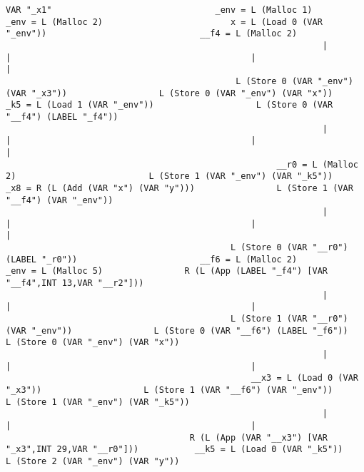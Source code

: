 \begin{landscape}
\begin{lstlisting}[basicstyle=\fontsize{6}{7}\selectfont\ttfamily]
            VAR "_x1"                                _env = L (Malloc 1)                                  _env = L (Malloc 2)                         x = L (Load 0 (VAR "_env"))                              __f4 = L (Malloc 2)
                                                              |                                                    |                                               |                                                    |
                                             L (Store 0 (VAR "_env") (VAR "_x3"))                  L (Store 0 (VAR "_env") (VAR "x"))                _k5 = L (Load 1 (VAR "_env"))                    L (Store 0 (VAR "__f4") (LABEL "_f4"))
                                                              |                                                    |                                               |                                                    |
                                                     __r0 = L (Malloc 2)                          L (Store 1 (VAR "_env") (VAR "_k5"))           _x8 = R (L (Add (VAR "x") (VAR "y")))                L (Store 1 (VAR "__f4") (VAR "_env"))
                                                              |                                                    |                                               |                                                    |
                                            L (Store 0 (VAR "__r0") (LABEL "_r0"))                        __f6 = L (Malloc 2)                             _env = L (Malloc 5)                R (L (App (LABEL "_f4") [VAR "__f4",INT 13,VAR "__r2"]))
                                                              |                                                    |                                               |
                                            L (Store 1 (VAR "__r0") (VAR "_env"))                L (Store 0 (VAR "__f6") (LABEL "_f6"))            L (Store 0 (VAR "_env") (VAR "x"))
                                                              |                                                    |                                               |
                                                __x3 = L (Load 0 (VAR "_x3"))                    L (Store 1 (VAR "__f6") (VAR "_env"))            L (Store 1 (VAR "_env") (VAR "_k5"))
                                                              |                                                    |                                               |
                                    R (L (App (VAR "__x3") [VAR "_x3",INT 29,VAR "__r0"]))           __k5 = L (Load 0 (VAR "_k5"))                 L (Store 2 (VAR "_env") (VAR "y"))

\end{lstlisting}
\end{landscape}
